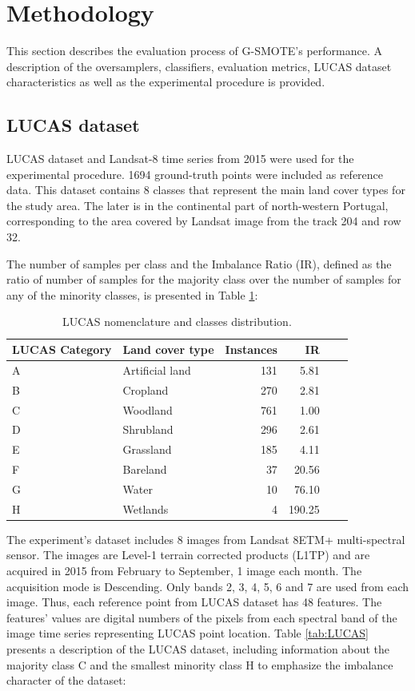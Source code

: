 \documentclass[remotesensing,article,submit,moreauthors,pdftex]{Definitions/mdpi}
\begin{document}
\section{Methodology}

This section describes the evaluation process of G-SMOTE's performance. A
description of the oversamplers, classifiers, evaluation metrics, LUCAS dataset
characteristics as well as the experimental procedure is provided.

\subsection{LUCAS dataset}

LUCAS dataset and Landsat-8 time series from 2015 were used for the experimental
procedure. 1694 ground-truth points were included as reference data. This
dataset contains 8 classes that represent the main land cover types for the
study area. The later is in the continental part of north-western Portugal,
corresponding to the area covered by Landsat image from the track 204 and row
32.

The number of samples per class and the Imbalance Ratio (IR), defined as the ratio of
number of samples for the majority class over the number of samples for any of
the minority classes, is presented in Table \ref{tab:classes_distribution}:

\begin{table}[H]
	\centering
	\begin{tabular}{llrrrr}
		\toprule
		\textbf{LUCAS Category} & \textbf{Land cover type} & \textbf{Instances}
		& \textbf{IR} \\
		\hline
		A & Artificial land & 131 & 5.81 \\
		B & Cropland        & 270 & 2.81 \\
		C & Woodland        & 761 & 1.00 \\
		D & Shrubland       & 296 & 2.61 \\
		E & Grassland       & 185 & 4.11 \\
		F & Bareland        & 37  & 20.56 \\
		G & Water           & 10  & 76.10 \\
		H & Wetlands        & 4   & 190.25\\
		\bottomrule
	\end{tabular}
	\caption{\label{tab:classes_distribution}LUCAS nomenclature and classes distribution.}
\end{table}

The experiment's dataset includes 8 images from Landsat 8ETM+ multi-spectral
sensor. The images are Level-1 terrain corrected products (L1TP) and are
acquired in 2015 from February to September, 1 image each month. The acquisition
mode is Descending. Only bands 2, 3, 4, 5, 6 and 7 are used from each image.
Thus, each reference point from LUCAS dataset has 48 features. The features'
values are digital numbers of the pixels from each spectral band of the image
time series representing LUCAS point location. Table \ref{tab:LUCAS} presents a
description of the LUCAS dataset, including information about the majority class
C and the smallest minority class H to emphasize the imbalance character of the
dataset:
\end{document}
